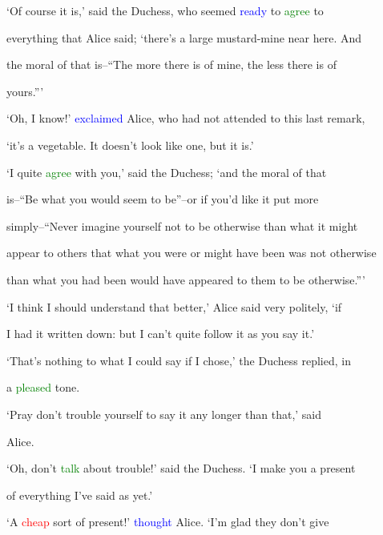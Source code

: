  ‘Of course it is,’ said the Duchess, who seemed \textcolor{blue}{ready} to \textcolor{green}{agree} to

 everything that Alice said; ‘there’s a large mustard-mine near here. And

 the \textcolor{BurntOrange}{moral} of that is--“The more there is of mine, the less there is of

 yours.”’



 ‘Oh, I know!’ \textcolor{blue}{exclaimed} Alice, who had not attended to this last remark,

 ‘it’s a vegetable. It doesn’t look like one, but it is.’



 ‘I quite \textcolor{green}{agree} with you,’ said the Duchess; ‘and the \textcolor{BurntOrange}{moral} of that

 is--“Be what you would seem to be”--or if you’d like it put more

 simply--“Never imagine yourself not to be otherwise than what it might

 appear to others that what you were or might have been was not otherwise

 than what you had been would have appeared to them to be otherwise.”’



 ‘I think I should understand that better,’ Alice said very politely, ‘if

 I had it written down: but I can’t quite follow it as you say it.’



 ‘That’s nothing to what I could say if I chose,’ the Duchess replied, in

 a \textcolor{green}{pleased} tone.



 \textcolor{BurntOrange}{‘Pray} don’t trouble yourself to say it any longer than that,’ said

 Alice.



 ‘Oh, don’t \textcolor{green}{talk} about trouble!’ said the Duchess. ‘I make you a \textcolor{BurntOrange}{present}

 of everything I’ve said as yet.’



 ‘A \textcolor{red}{cheap} sort of \textcolor{BurntOrange}{present!’} \textcolor{blue}{thought} Alice. ‘I’m \textcolor{BurntOrange}{glad} they don’t give


